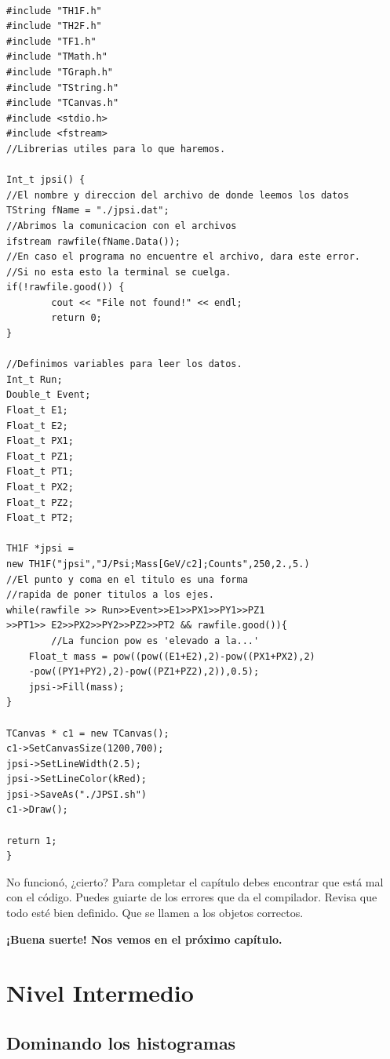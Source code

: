 \documentclass{article}
\begin{document}
\begin{tcolorbox} [breakable]
\begin{verbatim}

#include "TH1F.h"
#include "TH2F.h"
#include "TF1.h"
#include "TMath.h"
#include "TGraph.h"
#include "TString.h"
#include "TCanvas.h"
#include <stdio.h>
#include <fstream>
//Librerias utiles para lo que haremos.

Int_t jpsi() {
//El nombre y direccion del archivo de donde leemos los datos
TString fName = "./jpsi.dat";
//Abrimos la comunicacion con el archivos
ifstream rawfile(fName.Data());
//En caso el programa no encuentre el archivo, dara este error. 
//Si no esta esto la terminal se cuelga.
if(!rawfile.good()) {
        cout << "File not found!" << endl;
        return 0;
}

//Definimos variables para leer los datos.
Int_t Run;
Double_t Event;
Float_t E1;
Float_t E2;
Float_t PX1;
Float_t PZ1;
Float_t PT1;
Float_t PX2;
Float_t PZ2;
Float_t PT2;

TH1F *jpsi =
new TH1F("jpsi","J/Psi;Mass[GeV/c2];Counts",250,2.,5.)
//El punto y coma en el titulo es una forma
//rapida de poner titulos a los ejes.
while(rawfile >> Run>>Event>>E1>>PX1>>PY1>>PZ1
>>PT1>> E2>>PX2>>PY2>>PZ2>>PT2 && rawfile.good()){
        //La funcion pow es 'elevado a la...'
	Float_t mass = pow((pow((E1+E2),2)-pow((PX1+PX2),2) 
	-pow((PY1+PY2),2)-pow((PZ1+PZ2),2)),0.5);
	jpsi->Fill(mass);
}

TCanvas * c1 = new TCanvas();
c1->SetCanvasSize(1200,700);
jpsi->SetLineWidth(2.5);
jpsi->SetLineColor(kRed);
jpsi->SaveAs("./JPSI.sh")
c1->Draw();

return 1;
}
\end{verbatim}
\end{tcolorbox}

No funcion\'o, ¿cierto? Para completar el cap\'itulo debes encontrar que est\'a mal con el c\'odigo. \newline
Puedes guiarte de los errores que da el compilador. Revisa que todo est\'e bien definido. Que se llamen a los objetos correctos. \par
\vspace{1cm}
\textbf{¡Buena suerte! Nos vemos en el pr\'oximo cap\'itulo.}

\newpage
\section{Nivel Intermedio}

\subsection{Dominando los histogramas}
\end{document}
